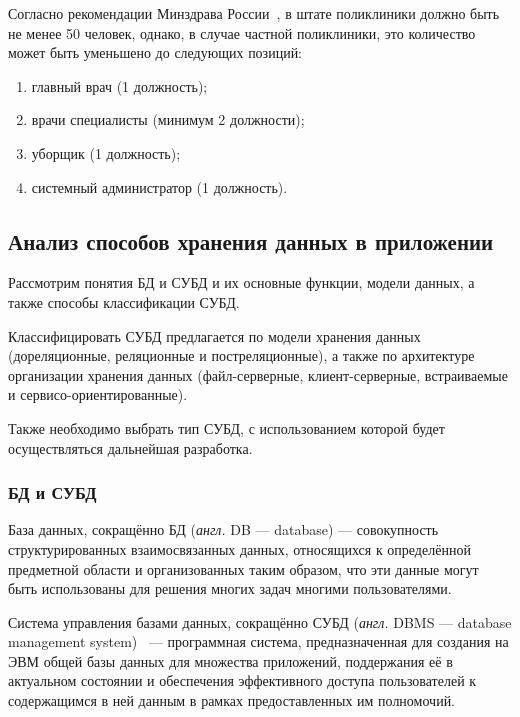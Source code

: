 Согласно рекомендации Минздрава России~\cite{minsdrav-state}, в штате поликлиники должно быть не менее 50 человек, однако, в случае частной поликлиники, это количество может быть уменьшено до следующих позиций:

\begin{enumerate}[label=\arabic*)]
	\item главный врач (1 должность);
	\item врачи специалисты (минимум 2 должности);
	\item уборщик (1 должность);
	\item системный администратор (1 должность).
\end{enumerate}



\subsection{Анализ способов хранения данных в приложении}

Рассмотрим понятия БД и СУБД и их основные функции, модели данных, а также способы классификации СУБД.

Классифицировать СУБД предлагается по модели хранения данных (дореляционные, реляционные и постреляционные), а также по архитектуре организации хранения данных (файл-серверные, клиент-серверные, встраиваемые и сервисо-ориентированные).

Также необходимо выбрать тип СУБД, с использованием которой будет осуществляться дальнейшая разработка.

\subsubsection{БД и СУБД}

База данных, сокращённо БД (\textit{англ.} DB --- database) \cite{carpova} --- совокупность структурированных взаимосвязанных данных, относящихся к определённой \linebreak предметной области и организованных таким образом, что эти данные могут быть использованы для решения многих задач многими пользователями.

Система управления базами данных, сокращённо СУБД (\textit{англ.} DBMS --- database management system)~\cite{carpova} --- программная система, предназначенная для создания на ЭВМ общей базы данных для множества приложений, поддержания её в актуальном состоянии и обеспечения эффективного доступа пользователей к содержащимся в ней данным в рамках предоставленных им полномочий. 

